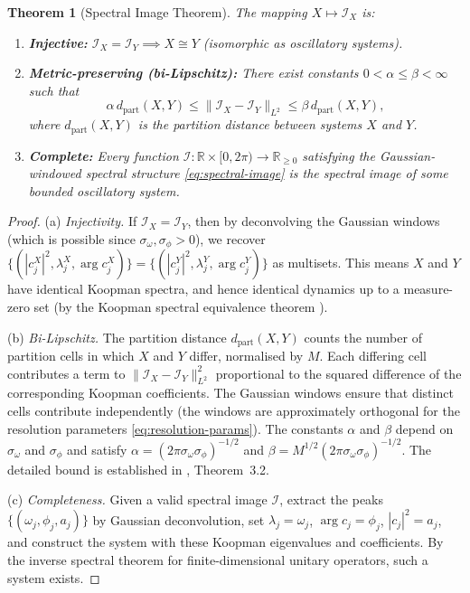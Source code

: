 \documentclass[11pt,twocolumn,a4paper]{article}
\newtheorem{theorem}{Theorem}[section]
\theoremstyle{definition}
\theoremstyle{remark}
\newcommand{\dpart}{d_{\mathrm{part}}}
\newcommand{\R}{\mathbb{R}}
\begin{document}
\begin{theorem}[Spectral Image Theorem]\label{thm:spectral-image}
The mapping $X \mapsto \mathcal{I}_X$ is:
\begin{enumerate}[label=(\alph*)]
    \item \textbf{Injective:} $\mathcal{I}_X = \mathcal{I}_Y \implies X \cong Y$ (isomorphic as oscillatory systems).
    \item \textbf{Metric-preserving (bi-Lipschitz):} There exist constants $0 < \alpha \leq \beta < \infty$ such that
    \begin{equation}\label{eq:bi-lipschitz}
        \alpha \, \dpart(X, Y) \leq \|\mathcal{I}_X - \mathcal{I}_Y\|_{L^2} \leq \beta \, \dpart(X, Y),
    \end{equation}
    where $\dpart(X, Y)$ is the partition distance between systems $X$ and $Y$.
    \item \textbf{Complete:} Every function $\mathcal{I} : \R \times [0, 2\pi) \to \R_{\geq 0}$ satisfying the Gaussian-windowed spectral structure \eqref{eq:spectral-image} is the spectral image of some bounded oscillatory system.
\end{enumerate}
\end{theorem}

\begin{proof}
(a) \emph{Injectivity.}  If $\mathcal{I}_X = \mathcal{I}_Y$, then by deconvolving the Gaussian windows (which is possible since $\sigma_\omega, \sigma_\phi > 0$), we recover $\{(|c_j^X|^2, \lambda_j^X, \arg c_j^X)\} = \{(|c_j^Y|^2, \lambda_j^Y, \arg c_j^Y)\}$ as multisets.  This means $X$ and $Y$ have identical Koopman spectra, and hence identical dynamics up to a measure-zero set (by the Koopman spectral equivalence theorem \citep{koopman1931hamiltonian}).

(b) \emph{Bi-Lipschitz.}  The partition distance $\dpart(X, Y)$ counts the number of partition cells in which $X$ and $Y$ differ, normalised by $M$.  Each differing cell contributes a term to $\|\mathcal{I}_X - \mathcal{I}_Y\|_{L^2}^2$ proportional to the squared difference of the corresponding Koopman coefficients.  The Gaussian windows ensure that distinct cells contribute independently (the windows are approximately orthogonal for the resolution parameters \eqref{eq:resolution-params}).  The constants $\alpha$ and $\beta$ depend on $\sigma_\omega$ and $\sigma_\phi$ and satisfy $\alpha = (2\pi\sigma_\omega\sigma_\phi)^{-1/2}$ and $\beta = M^{1/2}(2\pi\sigma_\omega\sigma_\phi)^{-1/2}$.  The detailed bound is established in \citet{sachikonye2026spectralmatching}, Theorem~3.2.

(c) \emph{Completeness.}  Given a valid spectral image $\mathcal{I}$, extract the peaks $\{(\omega_j, \phi_j, a_j)\}$ by Gaussian deconvolution, set $\lambda_j = \omega_j$, $\arg c_j = \phi_j$, $|c_j|^2 = a_j$, and construct the system with these Koopman eigenvalues and coefficients.  By the inverse spectral theorem for finite-dimensional unitary operators, such a system exists.
\end{proof}
\end{document}
